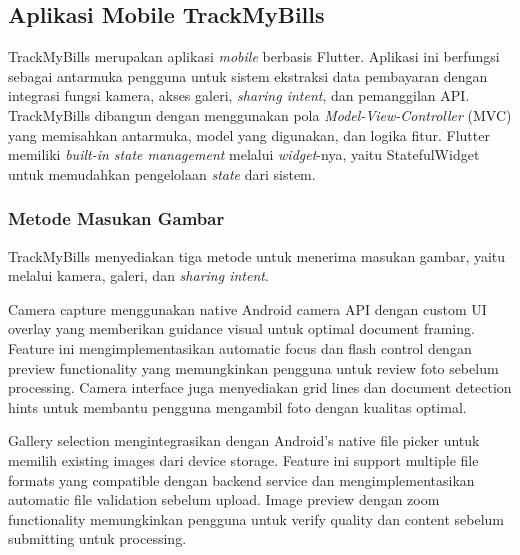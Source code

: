 \subsection{Aplikasi Mobile TrackMyBills}
\label{subsec:aplikasi-mobile-trackmybills}

TrackMyBills merupakan aplikasi \emph{mobile} berbasis Flutter. Aplikasi ini berfungsi sebagai antarmuka pengguna untuk sistem ekstraksi data pembayaran dengan integrasi fungsi kamera, akses galeri, \emph{sharing intent}, dan pemanggilan API. TrackMyBills dibangun dengan menggunakan pola \emph{Model-View-Controller} (MVC) yang memisahkan antarmuka, model yang digunakan, dan logika fitur. Flutter memiliki \emph{built-in state management} melalui \emph{widget}-nya, yaitu StatefulWidget untuk memudahkan pengelolaan \emph{state} dari sistem. 



\subsubsection{Metode Masukan Gambar}
\label{subsubsec:metode-masukan-gambar}

TrackMyBills menyediakan tiga metode untuk menerima masukan gambar, yaitu melalui kamera, galeri, dan \emph{sharing intent}. 

Camera capture menggunakan native Android camera API dengan custom UI overlay yang memberikan guidance visual untuk optimal document framing. Feature ini mengimplementasikan automatic focus dan flash control dengan preview functionality yang memungkinkan pengguna untuk review foto sebelum processing. Camera interface juga menyediakan grid lines dan document detection hints untuk membantu pengguna mengambil foto dengan kualitas optimal.

Gallery selection mengintegrasikan dengan Android's native file picker untuk memilih existing images dari device storage. Feature ini support multiple file formats yang compatible dengan backend service dan mengimplementasikan automatic file validation sebelum upload. Image preview dengan zoom functionality memungkinkan pengguna untuk verify quality dan content sebelum submitting untuk processing.


